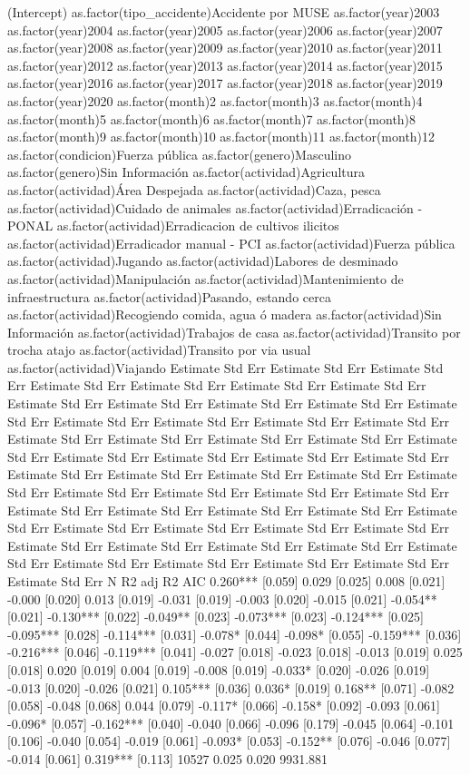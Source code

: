(Intercept)  as.factor(tipo_accidente)Accidente por MUSE  as.factor(year)2003  as.factor(year)2004  as.factor(year)2005  as.factor(year)2006  as.factor(year)2007  as.factor(year)2008  as.factor(year)2009  as.factor(year)2010  as.factor(year)2011  as.factor(year)2012  as.factor(year)2013  as.factor(year)2014  as.factor(year)2015  as.factor(year)2016  as.factor(year)2017  as.factor(year)2018  as.factor(year)2019  as.factor(year)2020  as.factor(month)2  as.factor(month)3  as.factor(month)4  as.factor(month)5  as.factor(month)6  as.factor(month)7  as.factor(month)8  as.factor(month)9  as.factor(month)10  as.factor(month)11  as.factor(month)12  as.factor(condicion)Fuerza pública  as.factor(genero)Masculino  as.factor(genero)Sin Información  as.factor(actividad)Agricultura  as.factor(actividad)Área Despejada  as.factor(actividad)Caza, pesca  as.factor(actividad)Cuidado de animales  as.factor(actividad)Erradicación - PONAL  as.factor(actividad)Erradicacion de cultivos ilicitos  as.factor(actividad)Erradicador manual - PCI  as.factor(actividad)Fuerza pública  as.factor(actividad)Jugando  as.factor(actividad)Labores de desminado  as.factor(actividad)Manipulación  as.factor(actividad)Mantenimiento de infraestructura  as.factor(actividad)Pasando, estando cerca  as.factor(actividad)Recogiendo comida, agua ó  madera  as.factor(actividad)Sin Información  as.factor(actividad)Trabajos de casa  as.factor(actividad)Transito por trocha atajo  as.factor(actividad)Transito por via usual  as.factor(actividad)Viajando      Estimate Std Err Estimate Std Err Estimate Std Err Estimate Std Err Estimate Std Err Estimate Std Err Estimate Std Err Estimate Std Err Estimate Std Err Estimate Std Err Estimate Std Err Estimate Std Err Estimate Std Err Estimate Std Err Estimate Std Err Estimate Std Err Estimate Std Err Estimate Std Err Estimate Std Err Estimate Std Err Estimate Std Err Estimate Std Err Estimate Std Err Estimate Std Err Estimate Std Err Estimate Std Err Estimate Std Err Estimate Std Err Estimate Std Err Estimate Std Err Estimate Std Err Estimate Std Err Estimate Std Err Estimate Std Err Estimate Std Err Estimate Std Err Estimate Std Err Estimate Std Err Estimate Std Err Estimate Std Err Estimate Std Err Estimate Std Err Estimate Std Err Estimate Std Err Estimate Std Err Estimate Std Err Estimate Std Err Estimate Std Err Estimate Std Err Estimate Std Err Estimate Std Err Estimate Std Err Estimate Std Err N R2 adj R2 AIC 0.260*** [0.059] 0.029 [0.025] 0.008 [0.021] -0.000 [0.020] 0.013 [0.019] -0.031 [0.019] -0.003 [0.020] -0.015 [0.021] -0.054** [0.021] -0.130*** [0.022] -0.049** [0.023] -0.073*** [0.023] -0.124*** [0.025] -0.095*** [0.028] -0.114*** [0.031] -0.078* [0.044] -0.098* [0.055] -0.159*** [0.036] -0.216*** [0.046] -0.119*** [0.041] -0.027 [0.018] -0.023 [0.018] -0.013 [0.019] 0.025 [0.018] 0.020 [0.019] 0.004 [0.019] -0.008 [0.019] -0.033* [0.020] -0.026 [0.019] -0.013 [0.020] -0.026 [0.021] 0.105*** [0.036] 0.036* [0.019] 0.168** [0.071] -0.082 [0.058] -0.048 [0.068] 0.044 [0.079] -0.117* [0.066] -0.158* [0.092] -0.093 [0.061] -0.096* [0.057] -0.162*** [0.040] -0.040 [0.066] -0.096 [0.179] -0.045 [0.064] -0.101 [0.106] -0.040 [0.054] -0.019 [0.061] -0.093* [0.053] -0.152** [0.076] -0.046 [0.077] -0.014 [0.061] 0.319*** [0.113] 10527 0.025 0.020 9931.881